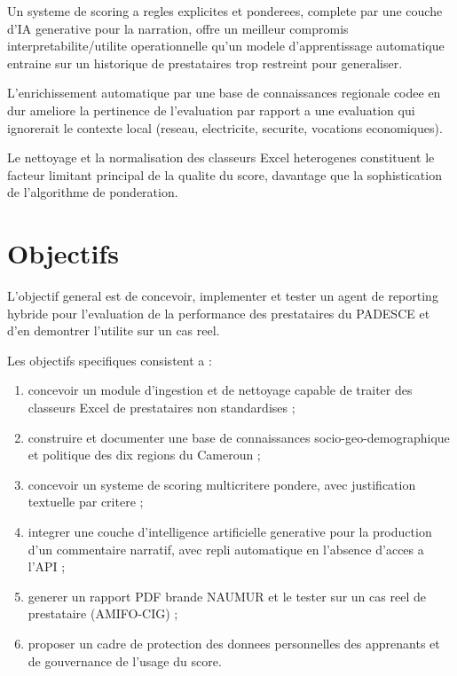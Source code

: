 \documentclass[12pt,a4paper,twoside,openany]{report}
\begin{document}
\begin{description}[leftmargin=1cm]
\item[H1.] Un systeme de scoring a regles explicites et ponderees, complete par une couche d'IA generative pour la narration, offre un meilleur compromis interpretabilite/utilite operationnelle qu'un modele d'apprentissage automatique entraine sur un historique de prestataires trop restreint pour generaliser.
\item[H2.] L'enrichissement automatique par une base de connaissances regionale codee en dur ameliore la pertinence de l'evaluation par rapport a une evaluation qui ignorerait le contexte local (reseau, electricite, securite, vocations economiques).
\item[H3.] Le nettoyage et la normalisation des classeurs Excel heterogenes constituent le facteur limitant principal de la qualite du score, davantage que la sophistication de l'algorithme de ponderation.
\end{description}

\section*{Objectifs}

L'objectif general est de concevoir, implementer et tester un agent de reporting hybride pour l'evaluation de la performance des prestataires du PADESCE et d'en demontrer l'utilite sur un cas reel.

Les objectifs specifiques consistent a :

\begin{enumerate}
\item concevoir un module d'ingestion et de nettoyage capable de traiter des classeurs Excel de prestataires non standardises ;
\item construire et documenter une base de connaissances socio-geo-demographique et politique des dix regions du Cameroun ;
\item concevoir un systeme de scoring multicritere pondere, avec justification textuelle par critere ;
\item integrer une couche d'intelligence artificielle generative pour la production d'un commentaire narratif, avec repli automatique en l'absence d'acces a l'API ;
\item generer un rapport PDF brande NAUMUR et le tester sur un cas reel de prestataire (AMIFO-CIG) ;
\item proposer un cadre de protection des donnees personnelles des apprenants et de gouvernance de l'usage du score.
\end{enumerate}
\end{document}
